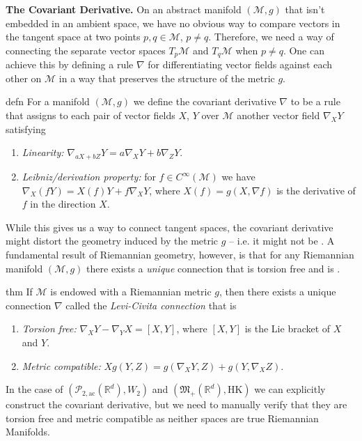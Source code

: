 \documentclass{article}
\newcommand{\man}{\mathcal{M}}
\newcommand{\pac}{\mathcal{P}_{2, \text{ac}}(\mathbb{R}^d)}
\newcommand{\posm}{\mathfrak{M}_+(\mathbb{R}^d)}
\begin{document}
\noindent \textbf{The Covariant Derivative.} 
On an abstract manifold $(\man, g)$ that isn't embedded in an ambient space, we have no obvious way to compare vectors in the tangent space at two points $p, q \in \man$, $p \neq q$. Therefore, we need a way of connecting the separate vector spaces $T_p\man$ and $T_q\man$ when $p \neq q$. One can achieve this by defining a rule $\nabla$ for differentiating vector fields against each other on $\man$ in a way that preserves the structure of the metric $g$.

\begin{restatable}{defn}{}
    For a manifold $(\man, g)$ we define the covariant derivative $\nabla$ to be a rule that assigns to each pair of vector fields $X$, $Y$ over $\man$ another vector field $\nabla_XY$ satisfying 
    \begin{enumerate}
        \item \textit{Linearity:} $\nabla_{aX+bZ}Y = a\nabla_XY + b\nabla_ZY.$
        \item \textit{Leibniz/derivation property:} for $f \in C^{\infty}(\man)$ we have $\nabla_X(fY) = X(f)Y + f\nabla_XY$, where $X(f) = g(X, \nabla f)$ is the derivative of $f$ in the direction $X$.
    \end{enumerate}
\end{restatable}

While this gives us a way to connect tangent spaces, the covariant derivative might distort the geometry induced by the metric $g$ -- i.e. it might not be . A fundamental result of Riemannian geometry, however, is that for any Riemannian manifold $(\man, g)$ there exists a \textit{unique} connection that is torsion free and is . 

\begin{restatable}{thm}{}
    If $\man$ is endowed with a Riemannian metric $g$, then there exists a unique connection $\nabla$ called the \textit{Levi-Civita connection} that is
    \begin{enumerate}
        \item \textit{Torsion free:} $\nabla_XY - \nabla_YX = [X,Y]$, where $[X,Y]$ is the Lie bracket of $X$ and $Y$. 
        \item \textit{Metric compatible:} $Xg(Y, Z) = g(\nabla_XY, Z) + g(Y, \nabla_XZ).$ 
    \end{enumerate}
\end{restatable}
In the case of $(\pac, W_2)$ and $(\posm, \text{HK})$ we can explicitly construct the covariant derivative, but we need to manually verify that they are torsion free and metric compatible as neither spaces are true Riemannian Manifolds.
\end{document}
